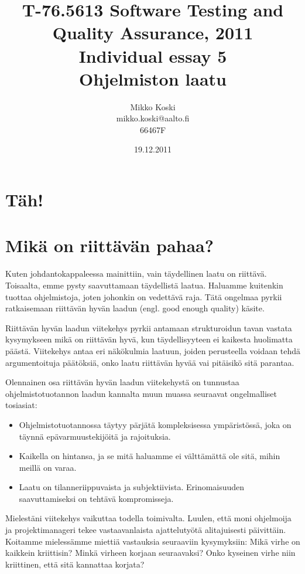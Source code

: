 \documentclass[a4paper]{article}
\begin{document}
\title{\small T-76.5613 Software Testing and Quality Assurance, 2011 \\ Individual essay 5 \\ \huge Ohjelmiston laatu}
\date{19.12.2011}
\author{Mikko Koski \\ mikko.koski@aalto.fi \\ 66467F}
\maketitle

\large

\section{Täh!}

\section{Mikä on riittävän pahaa?}

Kuten johdantokappaleessa mainittiin, vain täydellinen laatu on riittävä. Toisaalta, emme pysty saavuttamaan täydellistä laatua. Haluamme kuitenkin tuottaa ohjelmistoja, joten johonkin on vedettävä raja. Tätä ongelmaa pyrkii ratkaisemaan riittävän hyvän laadun (engl. good enough quality) käsite.

Riittävän hyvän laadun viitekehys pyrkii antamaan strukturoidun tavan vastata kysymykseen mikä on riittävän hyvä, kun täydellisyyteen ei kaikesta huolimatta päästä. Viitekehys antaa eri näkökulmia laatuun, joiden perusteella voidaan tehdä argumentoituja päätöksiä, onko laatu riittävän hyvää vai pitäisikö sitä parantaa. \citet{bach1997}

Olennainen osa riittävän hyvän laadun viitekehystä on tunnustaa ohjelmistotuotannon laadun kannalta muun muassa seuraavat ongelmalliset tosiasiat: 

\begin{itemize}
\item Ohjelmistotuotannossa täytyy pärjätä kompleksisessa ympäristössä, joka on täynnä epävarmuustekijöitä ja rajoituksia. 
\item Kaikella on hintansa, ja se mitä haluamme ei välttämättä ole sitä, mihin meillä on varaa. 
\item Laatu on tilanneriippuvaista ja subjektiivista. Erinomaisuuden saavuttamiseksi on tehtävä kompromisseja.
\end{itemize}

Mielestäni viitekehys vaikuttaa todella toimivalta. Luulen, että moni ohjelmoija ja projektimanageri tekee vastaavanlaista ajattelutyötä alitajuisesti päivittäin. Koitamme mielessämme miettiä vastauksia seuraaviin kysymyksiin: Mikä virhe on kaikkein kriittisin? Minkä virheen korjaan seuraavaksi? Onko kyseinen virhe niin kriittinen, että sitä kannattaa korjata?
\end{document}
